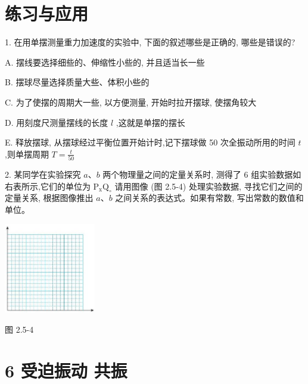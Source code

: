 \documentclass[10pt]{article}
\begin{document}
\section*{练习与应用}

1. 在用单摆测量重力加速度的实验中, 下面的叙述哪些是正确的, 哪些是错误的?

A. 摆线要选择细些的、伸缩性小些的, 并且适当长一些

B. 摆球尽量选择质量大些、体积小些的

C. 为了使摆的周期大一些, 以方便测量, 开始时拉开摆球, 使摆角较大

D. 用刻度尺测量摆线的长度 \(l\) ,这就是单摆的摆长

E. 释放摆球, 从摆球经过平衡位置开始计时,记下摆球做 50 次全振动所用的时间 \(t\) ,则单摆周期 \(T = \frac{t}{50}\)

2. 某同学在实验探究 \(a\text{、}b\) 两个物理量之间的定量关系时, 测得了 6 组实验数据如右表所示,它们的单位为 \({\mathrm{P}}_{\mathrm{x}}{\mathrm{Q}}_{ \circ }\) 请用图像 (图 2.5-4) 处理实验数据, 寻找它们之间的定量关系, 根据图像推出 \(a\text{、}b\) 之间关系的表达式。如果有常数, 写出常数的数值和单位。

\begin{center}
\end{center}

\begin{center}
\includegraphics[max width=0.3\textwidth]{images/01910e4c-ebb8-7d2c-8f2f-2375bc1d2d12_58_708991.jpg}
\end{center}

图 2.5-4

\section*{6 受迫振动 共振}
\end{document}
